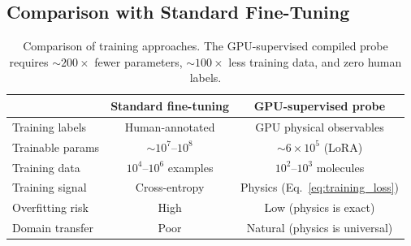 \documentclass[11pt,twocolumn,a4paper]{article}
\theoremstyle{definition}
\theoremstyle{remark}
\begin{document}
\subsection{Comparison with Standard Fine-Tuning}

\begin{table}[h]
\centering
\small
\begin{tabular}{lcc}
\toprule
& \textbf{Standard fine-tuning} & \textbf{GPU-supervised probe} \\
\midrule
Training labels & Human-annotated & GPU physical observables \\
Trainable params & $\sim 10^7$--$10^8$ & $\sim 6 \times 10^5$ (LoRA) \\
Training data & $10^4$--$10^6$ examples & $10^2$--$10^3$ molecules \\
Training signal & Cross-entropy & Physics (Eq.~\ref{eq:training_loss}) \\
Overfitting risk & High & Low (physics is exact) \\
Domain transfer & Poor & Natural (physics is universal) \\
\bottomrule
\end{tabular}
\caption{Comparison of training approaches. The GPU-supervised compiled probe requires $\sim 200\times$ fewer parameters, $\sim 100\times$ less training data, and zero human labels.}
\label{tab:training_comparison}
\end{table}
\end{document}
